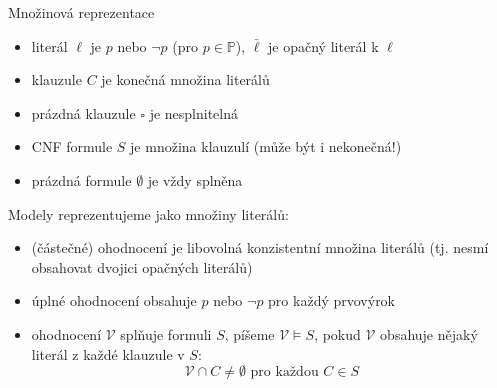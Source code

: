 \documentclass{beamer}
\begin{document}
\begin{frame}{Množinová reprezentace}

    \begin{itemize}
        \item \alert{literál} $\ell$ je $p$ nebo $\neg p$ (pro $p\in\mathbb P$), $\bar \ell$ je \alert{opačný literál} k $\ell$
        \item \alert{klauzule} $C$ je konečná množina literálů
        \item \alert{prázdná klauzule} $\square$ je nesplnitelná
        \item \alert{CNF formule} $S$ je množina klauzulí (může být i \alert{nekonečná}!)
        \item \alert{prázdná formule} $\emptyset$ je vždy splněna
    \end{itemize}
    Modely reprezentujeme jako množiny literálů:
    \begin{itemize}
        \item \alert{(částečné) ohodnocení} je libovolná \alert{konzistentní} množina literálů (tj. nesmí obsahovat dvojici opačných literálů) 
        \item\alert{úplné ohodnocení} obsahuje $p$ nebo $\neg p$ pro každý prvovýrok
        \item ohodnocení $\mathcal V$ \alert{splňuje} formuli $S$, píšeme \alert{$\mathcal V\models S$}, pokud $\mathcal V$ obsahuje nějaký literál z každé klauzule v $S$:
        $$
        \mathcal V\cap C\neq\emptyset\text{ pro každou }C\in S
        $$
    \end{itemize}

\end{frame}
\end{document}
